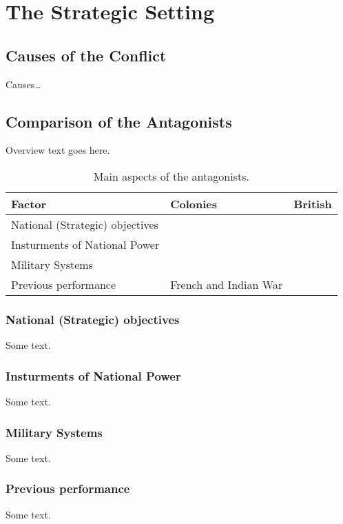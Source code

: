\section{The Strategic Setting}

\subsection{Causes of the Conflict}

Causes\ldots

\subsection{Comparison of the Antagonists}

Overview text goes here.

\begin{table}[h!]
\caption{Main aspects of the antagonists.}
\begin{tabular}{p{2in}p{2in}p{2in}}
Factor				&	Colonies	& British	\\\hline
National (Strategic) objectives	&			&		\\
Insturments of National Power	&			&		\\
Military Systems		&			&		\\
Previous performance		& French and Indian War	&		\\
\end{tabular}
\end{table}

\subsubsection{National (Strategic) objectives}

Some text.

\subsubsection{Insturments of National Power}

Some text.

\subsubsection{Military Systems}

Some text.

\subsubsection{Previous performance}

Some text.


